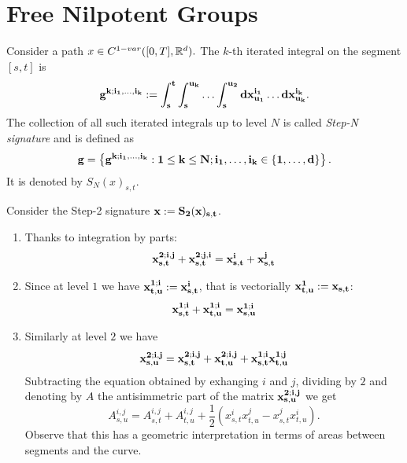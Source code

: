 \section{Free Nilpotent Groups}

\begin{definition}
    Consider a path \(x \in C^{1-var}([0,T],\mathbb{R}^d).\)
    The \(k\)-th iterated integral on the segment \([s,t]\) is
    \begin{equation}
        \bf{g}^{k;i_1,\ldots,i_k}:= \int_s^t \int_s^{u_k} \ldots \int_s^{u_2} dx^{i_1}_{u_1} \ldots dx^{i_k}_{u_k}.
    \end{equation}
    The collection of all such iterated integrals up to level \(N\) is called \textit{Step-N signature} and is defined as
    \begin{equation}
        \bf{g} = \left\{ \bf{g}^{k;i_1,\ldots,i_k}: 1 \le k \le N; i_1, \ldots, i_k \in \{1,\ldots,d\} \right\}.
    \end{equation}
    It is denoted by \(S_N(x)_{s,t}\).
\end{definition}

\begin{example}
    Consider the Step-2 signature \(\bf{x}:=S_2(x)_{s,t} \).
    \begin{enumerate}
        \item Thanks to integration by parts:
        \begin{equation}
            \bf{x}_{s,t}^{2;i,j} + \bf{x}_{s,t}^{2;j,i} = x^i_{s,t} + x^j_{s,t}
        \end{equation}
        \item Since at level \(1\) we have \(\bf{x}_{t,u}^{1;i} := x^i_{s,t}\), that is vectorially 
        \(\bf{x}_{t,u}^{1} := x_{s,t}\):
        \begin{equation}
            \bf{x}_{s,t}^{1;i} + \bf{x}_{t,u}^{1;i} = \bf{x}_{s,u}^{1;i}
        \end{equation}
        \item Similarly at level \(2\) we have
        \begin{equation}
            \bf{x}_{s,u}^{2;i,j} = \bf{x}_{s,t}^{2;i,j} + \bf{x}_{t,u}^{2;i,j} + \bf{x}_{s,t}^{1;i} \bf{x}_{t,u}^{1;j}
        \end{equation}
        Subtracting the equation obtained by exhanging \(i\) and \(j\), dividing by \(2\) and denoting by \(A\) the antisimmetric part of the matrix \(\bf{x}_{s,u}^{2;i,j}\) we get
        \begin{equation}
            A^{i,j}_{s,u} = A^{i,j}_{s,t} + A^{i,j}_{t,u} + \frac{1}{2} \left( x^i_{s,t} x^j_{t,u} - x^j_{s,t} x^i_{t,u} \right).
        \end{equation}
        Observe that this has a geometric interpretation in terms of areas between segments and the curve.
    \end{enumerate}
\end{example}

